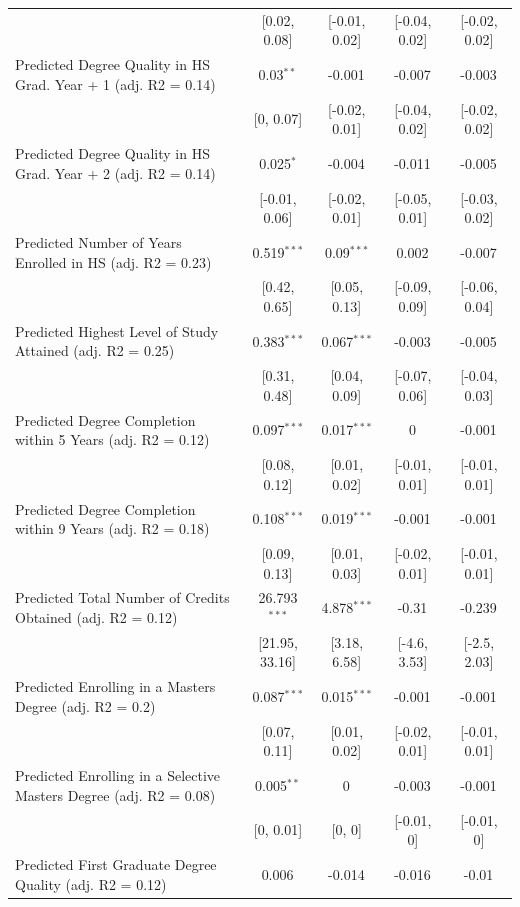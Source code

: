 \begin{table}[H]
{\begin{threeparttable}
\begin{tabular}[t]{lcccc}
 & {}[0.02, 0.08] & {}[-0.01, 0.02] & {}[-0.04, 0.02] & {}[-0.02, 0.02]\\
Predicted Degree Quality in HS Grad. Year + 1 (adj. R2 = 0.14) & 0.03$^{**}$ & -0.001$^{}$ & -0.007$^{}$ & -0.003$^{}$\\
 & {}[0, 0.07] & {}[-0.02, 0.01] & {}[-0.04, 0.02] & {}[-0.02, 0.02]\\
Predicted Degree Quality in HS Grad. Year + 2 (adj. R2 = 0.14) & 0.025$^{*}$ & -0.004$^{}$ & -0.011$^{}$ & -0.005$^{}$\\
 & {}[-0.01, 0.06] & {}[-0.02, 0.01] & {}[-0.05, 0.01] & {}[-0.03, 0.02]\\
Predicted Number of Years Enrolled in HS (adj. R2 = 0.23) & 0.519$^{***}$ & 0.09$^{***}$ & 0.002$^{}$ & -0.007$^{}$\\
 & {}[0.42, 0.65] & {}[0.05, 0.13] & {}[-0.09, 0.09] & {}[-0.06, 0.04]\\
Predicted Highest Level of Study Attained (adj. R2 = 0.25) & 0.383$^{***}$ & 0.067$^{***}$ & -0.003$^{}$ & -0.005$^{}$\\
 & {}[0.31, 0.48] & {}[0.04, 0.09] & {}[-0.07, 0.06] & {}[-0.04, 0.03]\\
Predicted Degree Completion within 5 Years (adj. R2 = 0.12) & 0.097$^{***}$ & 0.017$^{***}$ & 0$^{}$ & -0.001$^{}$\\
 & {}[0.08, 0.12] & {}[0.01, 0.02] & {}[-0.01, 0.01] & {}[-0.01, 0.01]\\
Predicted Degree Completion within 9 Years (adj. R2 = 0.18) & 0.108$^{***}$ & 0.019$^{***}$ & -0.001$^{}$ & -0.001$^{}$\\
 & {}[0.09, 0.13] & {}[0.01, 0.03] & {}[-0.02, 0.01] & {}[-0.01, 0.01]\\
Predicted Total Number of Credits Obtained (adj. R2 = 0.12) & 26.793$^{***}$ & 4.878$^{***}$ & -0.31$^{}$ & -0.239$^{}$\\
 & {}[21.95, 33.16] & {}[3.18, 6.58] & {}[-4.6, 3.53] & {}[-2.5, 2.03]\\
Predicted Enrolling in a Masters Degree (adj. R2 = 0.2) & 0.087$^{***}$ & 0.015$^{***}$ & -0.001$^{}$ & -0.001$^{}$\\
 & {}[0.07, 0.11] & {}[0.01, 0.02] & {}[-0.02, 0.01] & {}[-0.01, 0.01]\\
Predicted Enrolling in a Selective Masters Degree (adj. R2 = 0.08) & 0.005$^{**}$ & 0$^{}$ & -0.003$^{}$ & -0.001$^{}$\\
 & {}[0, 0.01] & {}[0, 0] & {}[-0.01, 0] & {}[-0.01, 0]\\
Predicted First Graduate Degree Quality (adj. R2 = 0.12) & 0.006$^{}$ & -0.014$^{}$ & -0.016$^{}$ & -0.01$^{}$\\

\end{tabular}
\end{threeparttable}}
\end{table}
